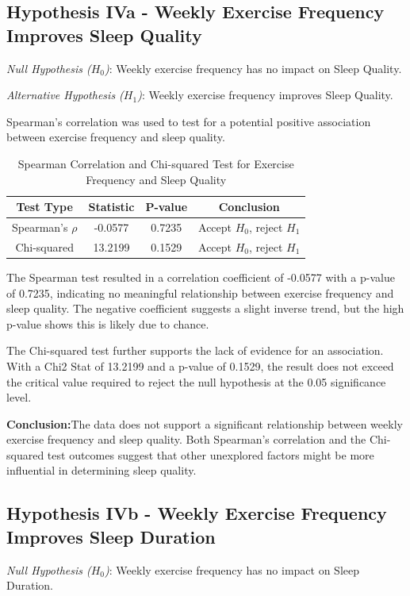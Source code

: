 \documentclass[conference]{IEEEtran}
\begin{document}
\subsection*{Hypothesis IVa - Weekly Exercise Frequency Improves Sleep Quality}
\textit{Null Hypothesis (\(H_0\))}: Weekly exercise frequency has no impact on Sleep Quality.

\textit{Alternative Hypothesis (\(H_1\))}: Weekly exercise frequency improves Sleep Quality.

Spearman's correlation was used to test for a potential positive association between exercise frequency and sleep quality.

\begin{table}[ht]
    \centering
    \caption{Spearman Correlation and Chi-squared Test for Exercise Frequency and Sleep Quality}
    \label{tab:hypothesis4a}
    \begin{tabular}{|c|c|c|c|}
        \hline
        \textbf{Test Type}  & \textbf{Statistic} & \textbf{P-value} & \textbf{Conclusion}            \\
        \hline
        Spearman's \(\rho\) & -0.0577            & 0.7235           & Accept \(H_0\), reject \(H_1\) \\
        \hline
        Chi-squared         & 13.2199            & 0.1529           & Accept \(H_0\), reject \(H_1\) \\
        \hline
    \end{tabular}
\end{table}

The Spearman test resulted in a correlation coefficient of -0.0577 with a p-value of 0.7235, indicating no meaningful relationship between exercise frequency and sleep quality. The negative coefficient suggests a slight inverse trend, but the high p-value shows this is likely due to chance.

The Chi-squared test further supports the lack of evidence for an association. With a Chi2 Stat of 13.2199 and a p-value of 0.1529, the result does not exceed the critical value required to reject the null hypothesis at the 0.05 significance level.

\textbf{Conclusion:}The data does not support a significant relationship between weekly exercise frequency and sleep quality. Both Spearman's correlation and the Chi-squared test outcomes suggest that other unexplored factors might be more influential in determining sleep quality.

\subsection*{Hypothesis IVb - Weekly Exercise Frequency Improves Sleep Duration}
\textit{Null Hypothesis (\(H_0\))}: Weekly exercise frequency has no impact on Sleep Duration.
\end{document}
